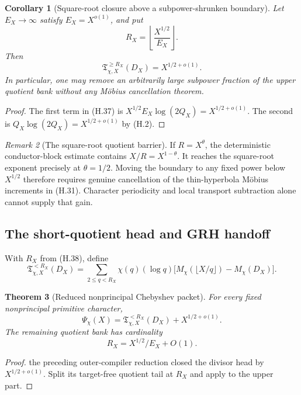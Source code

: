 \documentclass[11pt]{article}
\newtheorem{theorem}{Theorem}[section]
\newtheorem{corollary}[theorem]{Corollary}
\theoremstyle{definition}
\theoremstyle{remark}
\newtheorem{remark}[theorem]{Remark}
\begin{document}
\begin{corollary}[Square-root closure above a subpower-shrunken boundary]
\label{cor:hyperbola-terminal-square-root}
Let \(E_X\to\infty\) satisfy \(E_X=X^{o(1)}\), and put
\[
 R_X=\left\lfloor\frac{X^{1/2}}{E_X}\right\rfloor.
 \tag{H.38}
\]
Then
\[
 \boxed{
 \mathfrak T_{\chi,X}^{\ge R_X}(D_X)
 =X^{1/2+o(1)}.}
 \tag{H.39}
\]
In particular, one may remove an arbitrarily large subpower fraction of the
upper quotient bank without any M\"obius cancellation theorem.
\end{corollary}

\begin{proof}
The first term in \textup{(H.37)} is
\(X^{1/2}E_X\log(2Q_X)=X^{1/2+o(1)}\).  The second is
\(Q_X\log(2Q_X)=X^{1/2+o(1)}\) by \textup{(H.2)}.
\end{proof}

\begin{remark}[The square-root quotient barrier]
If \(R=X^\theta\), the deterministic conductor-block estimate contains
\(X/R=X^{1-\theta}\).  It reaches the square-root exponent precisely at
\(\theta=1/2\).  Moving the boundary to any fixed power below \(X^{1/2}\)
therefore requires genuine cancellation of the thin-hyperbola M\"obius
increments in \textup{(H.31)}.  Character periodicity and local transport
subtraction alone cannot supply that gain.
\end{remark}

\subsection{The short-quotient head and GRH handoff}
\label{subsec:hyperbola-head-handoff}

With \(R_X\) from \textup{(H.38)}, define
\[
 \boxed{
 \mathfrak T_{\chi,X}^{<R_X}(D_X)
 =\sum_{2\le q<R_X}
  \chi(q)(\log q)
  \bigl[M_\chi(\lfloor X/q\rfloor)-M_\chi(D_X)\bigr].}
 \tag{H.40}
\]

\begin{theorem}[Reduced nonprincipal Chebyshev packet]
\label{thm:hyperbola-reduced-packet}
For every fixed nonprincipal primitive character,
\[
 \boxed{
 \Psi_\chi(X)
 =\mathfrak T_{\chi,X}^{<R_X}(D_X)
  +X^{1/2+o(1)}.}
 \tag{H.41}
\]
The remaining quotient bank has cardinality
\[
 \boxed{
 R_X=X^{1/2}/E_X+O(1).}
 \tag{H.42}
\]
\end{theorem}

\begin{proof}
the preceding outer-compiler reduction closed the divisor head by
\(X^{1/2+o(1)}\).  Split its target-free quotient tail at \(R_X\) and apply
 to the upper part.
\end{proof}
\end{document}
